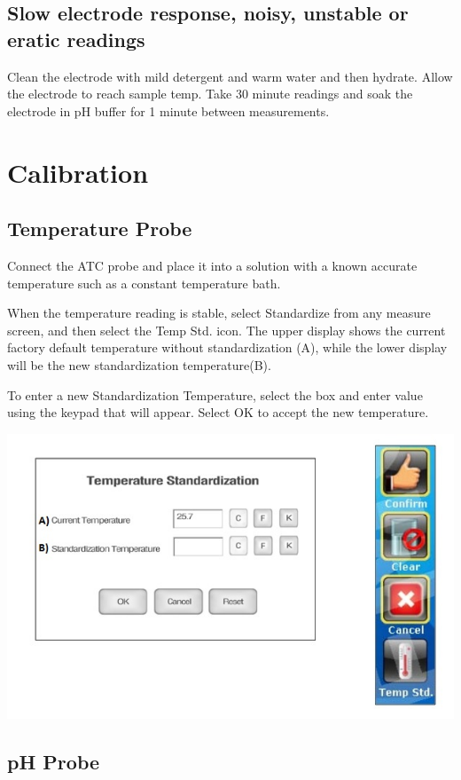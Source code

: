 \documentclass[12pt]{../SOP3_beta}\usepackage[]{graphicx}\usepackage[]{color}
\begin{document}
\subsection{Slow electrode response, noisy, unstable or eratic readings}

\NP Clean the electrode with mild detergent and warm water and then hydrate. Allow the electrode to reach sample temp. Take 30 minute readings and soak the electrode in pH buffer for 1 minute between measurements.

\section{Calibration}

\subsection{Temperature Probe}

\NP Connect the ATC probe and place it into a solution with a known accurate temperature such as a constant temperature bath.

\NP When the temperature reading is stable, select Standardize from any measure screen, and then select the Temp Std. icon. The upper display shows the current factory default temperature without standardization (A), while the lower display will be the new standardization temperature(B).

\NP To enter a new Standardization Temperature, select the box and enter value using the keypad that will appear. Select OK to accept the new temperature.

\includegraphics{Tempstandard.jpg}

\subsection{pH Probe}
\end{document}
